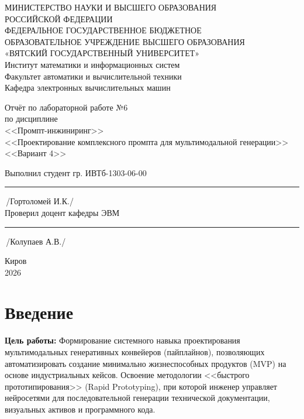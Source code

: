 \documentclass[oneside,a4paper,14pt]{extarticle}
\begin{document}
  \newpage\thispagestyle{empty}
  \begin{center}
    МИНИСТЕРСТВО НАУКИ И ВЫСШЕГО ОБРАЗОВАНИЯ\\
    РОССИЙСКОЙ ФЕДЕРАЦИИ\\
    ФЕДЕРАЛЬНОЕ ГОСУДАРСТВЕННОЕ БЮДЖЕТНОЕ\\
    ОБРАЗОВАТЕЛЬНОЕ УЧРЕЖДЕНИЕ ВЫСШЕГО ОБРАЗОВАНИЯ\\
    «ВЯТСКИЙ ГОСУДАРСТВЕННЫЙ УНИВЕРСИТЕТ»\\
    Институт математики и информационных систем\\
    Факультет автоматики и вычислительной техники\\
    Кафедра электронных вычислительных машин
  \end{center}
  \vspace{20mm}
  \begin{center}
    Отчёт по лабораторной работе №6\\
    по дисциплине\\
    <<Промпт-инжиниринг>>\\
    <<Проектирование комплексного промпта для мультимодальной генерации>>\\
    <<Вариант 4>>\\
  \end{center}
  \vspace{48mm}
  \noindent
  Выполнил студент гр. ИВТб-1303-06-00 \hfill \rule[-0.5mm]{30mm}{0.15mm}\,/Гортоломей И.К./\\[0.5cm]
  Проверил доцент кафедры ЭВМ \hfill \rule[-0.5mm]{30mm}{0.15mm}\,/Колупаев А.В./
  \vfill
  \begin{center}
    Киров\\
    2026
  \end{center}

\newpage
\thispagestyle{empty}

\section*{Введение}
\noindent
\textbf{Цель работы:} Формирование системного навыка проектирования мультимодальных генеративных конвейеров (пайплайнов), позволяющих автоматизировать создание минимально жизнеспособных продуктов (MVP) на основе индустриальных кейсов. Освоение методологии <<быстрого прототипирования>> (Rapid Prototyping), при которой инженер управляет нейросетями для последовательной генерации технической документации, визуальных активов и программного кода.
\end{document}
